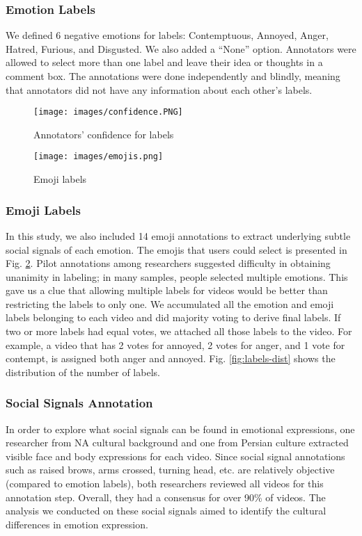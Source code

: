 \documentclass[letterpaper, 10 pt, conference]{ieeeconf}  \usepackage{FG2021}
\begin{document}
\subsubsection{Emotion Labels}
We defined 6 negative emotions for labels: Contemptuous, Annoyed, Anger, Hatred, Furious, and Disgusted. We also added a “None” option. Annotators were allowed to select more than one label and leave their idea or thoughts in a comment box. The annotations were done independently and blindly, meaning that annotators did not have any information about each other's labels.

\begin{figure}[t]
\centering
\texttt{[image: images/confidence.PNG]}
\caption{Annotators' confidence for labels}

\label{fig:confidence}
\end{figure}



\begin{figure}[t]
\centering
\texttt{[image: images/emojis.png]}
\caption{Emoji labels}
\label{fig:emojis}
\end{figure}


\subsubsection{Emoji Labels}
 In this study, we also included 14 emoji annotations to extract underlying subtle social signals of each emotion. The emojis that users could select is presented in Fig. \ref{fig:emojis}. Pilot annotations among researchers suggested difficulty in obtaining unanimity in labeling; in many samples, people selected multiple emotions. This gave us a clue that allowing multiple labels for videos would be better than restricting the labels to only one. We accumulated all the emotion and emoji labels belonging to each video and did majority voting to derive final labels. If two or more labels had equal votes, we attached all those labels to the video. For example, a video that has 2 votes for annoyed, 2 votes for anger, and 1 vote for contempt, is assigned both anger and annoyed. Fig. \ref{fig:labels-dist} shows the distribution of the number of labels.
 

 
 \subsubsection{Social Signals Annotation}
 In order to explore what social signals can be found in emotional expressions, one researcher from NA cultural background and one from Persian culture extracted visible face and body expressions for each video. Since social signal annotations such as raised brows, arms crossed, turning head, etc. are relatively objective (compared to emotion labels), both researchers reviewed all videos for this annotation step. Overall, they had a consensus for over 90\% of videos. The analysis we conducted on these social signals aimed to identify the cultural differences in emotion expression.
 
\end{document}
